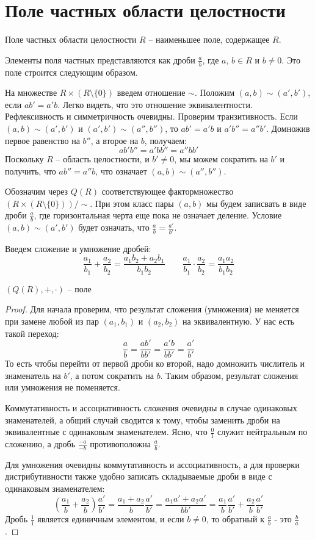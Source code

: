 \section{Поле частных области целостности}
\begin{conj}
    Поле частных области целостности $R$ -- наименьшее поле, содержащее $R$.
\end{conj}
Элементы поля частных представляются как дроби $\frac{a}{b}$, где $a, \, b \in R$ и $b \neq 0$.
Это поле строится следующим образом.

На множестве $R \times (R \setminus \{0\})$ введем отношение $\sim$. Положим $(a, b) \sim (a', b')$, если $ab' = a'b$. 
Легко видеть, что это отношение эквивалентности.
Рефлексивность и симметричность очевидны. Проверим транзитивность.
Если $(a, b) \sim (a', b')$ и $(a', b') \sim (a'', b'')$, то $ab' = a'b$ и $a'b'' = a''b'$. 
Домножив первое равенство на $b''$, а второе на $b$, получаем:
\[ ab'b'' = a'bb'' = a''bb' \]
Поскольку $R$ -- область целостности, и $b' \neq 0$, мы можем сократить на $b'$ и получить, что $ab'' = a''b$, что означает $(a, b) \sim (a'', b'')$.

Обозначим через $Q(R)$ соответствующее фактормножество $(R \times (R \setminus \{0\})) / \sim$.
При этом класс пары $(a, b)$ мы будем записвать в виде дроби $\frac{a}{b}$, где горизонтальная черта еще пока не означает деление.
Условие $(a, b) \sim (a', b')$ будет означать, что $\frac{a}{b} = \frac{a'}{b'}$.

Введем сложение и умножение дробей:
\[ \frac{a_1}{b_1} + \frac{a_2}{b_2} = \frac{a_1b_2 + a_2b_1}{b_1b_2} \quad\quad 
\frac{a_1}{b_1} \cdot \frac{a_2}{b_2} = \frac{a_1a_2}{b_1b_2} \]

\begin{theorem-non}
    $(Q(R), +, \cdot)$ -- поле
\end{theorem-non}

\begin{proof}
    Для начала проверим, что результат сложения (умножения) не меняется при замене любой из пар $(a_1, b_1)$ и $(a_2, b_2)$ на эквивалентную.
    У нас есть такой переход:
    \[ \frac{a}{b} = \frac{ab'}{bb'} = \frac{a'b}{bb'} = \frac{a'}{b'} \]
    То есть чтобы перейти от первой дроби ко второй, надо домножить числитель и знаменатель на $b'$, а потом сократить на $b$. Таким образом, результат сложения или умножения не поменяется.
    
    Коммутативность и ассоциативность сложения очевидны в случае одинаковых знаменателей, а общий случай сводится к тому, чтобы заменить дроби на эквивалентные с одинаковым знаменателем.
    Ясно, что $\frac{0}{1}$ служит нейтральным по сложению, а дробь $\frac{-a}{-b}$ противоположна $\frac{a}{b}$.
    
    Для умножения очевидны коммутативность и ассоциативность, 
    а для проверки дистрибутивности также удобно записать складываемые дроби в виде с одинаковым знаменателем:
    \[ (\frac{a_1}{b} + \frac{a_2}{b})\frac{a'}{b'} = \frac{a_1 + a_2}{b}\frac{a'}{b'} 
    = \frac{a_1a' + a_2a'}{bb'} = \frac{a_1}{b}\frac{a'}{b'} + \frac{a_2}{b}\frac{a'}{b'} \]
    Дробь $\frac{1}{1}$ является единичным элементом, и если $b \neq 0$, то обратный к $\frac{a}{b}$ - это $\frac{b}{a}$.
\end{proof}

